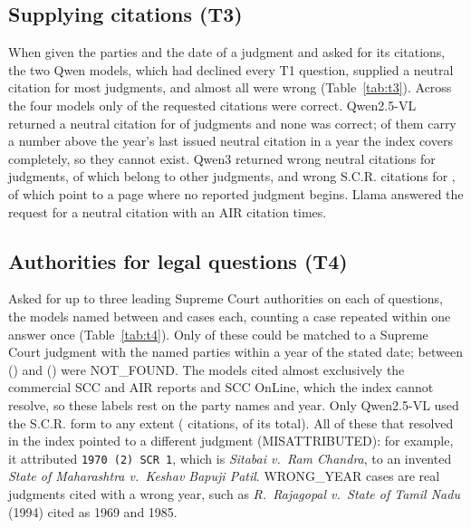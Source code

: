 \subsection{Supplying citations (T3)}
When given the parties and the date of a judgment and asked for its citations, the two Qwen models, which had declined every T1 question, supplied a neutral citation for most judgments, and almost all were wrong (Table~\ref{tab:t3}). Across the four models only \TThreeCorrectAll{} of the \TThreeAskedAll{} requested citations were correct. Qwen2.5-VL returned a neutral citation for \TThreeNeutralWrongQwenVL{} of \NumTThree{} judgments and none was correct; \TThreeUnassignedQwenVL{} of them carry a number above the year's last issued neutral citation in a year the index covers completely, so they cannot exist. Qwen3 returned wrong neutral citations for \TThreeNeutralWrongQwen{} judgments, \TThreeNeutralOtherJudgmentQwen{} of which belong to other judgments, and wrong S.C.R. citations for \TThreeScrWrongQwen{}, \TThreeScrNoJudgmentQwen{} of which point to a page where no reported judgment begins. Llama answered the request for a neutral citation with an AIR citation \TThreeNeutralOtherFormatLlama{} times.

\begin{table}[t]
\caption{Supplying the citations of \NumTThree{} known judgments, given parties and decision date. Corr.\ = exact match; Wrong = any other non-empty answer; Empty = no citation given.}
\label{tab:t3}
\centering
\setlength{\tabcolsep}{4pt}

\end{table}

\subsection{Authorities for legal questions (T4)}
Asked for up to three leading Supreme Court authorities on each of \NumTopics{} questions, the models named between \TFourCasesMin{} and \TFourCasesMax{} cases each, counting a case repeated within one answer once (Table~\ref{tab:t4}). Only \TFourVerifiedRange{} of these could be matched to a Supreme Court judgment with the named parties within a year of the stated date; between \TFourNFMinPct{} (\TFourNFMinModel) and \TFourNFMaxPct{} (\TFourNFMaxModel) were NOT\_FOUND. The models cited almost exclusively the commercial SCC and AIR reports and SCC OnLine, which the index cannot resolve, so these labels rest on the party names and year. Only Qwen2.5-VL used the S.C.R. form to any extent (\TFourReporterCitesQwenVL{} citations, \TFourReporterCitePctQwenVL{} of its total). All \TFourReporterResolvedMisQwenVL{} of these that resolved in the index pointed to a different judgment (MISATTRIBUTED): for example, it attributed \texttt{1970 (2) SCR 1}, which is \emph{Sitabai v.\ Ram Chandra}, to an invented \emph{State of Maharashtra v.\ Keshav Bapuji Patil}. WRONG\_YEAR cases are real judgments cited with a wrong year, such as \emph{R.\ Rajagopal v.\ State of Tamil Nadu} (1994) cited as 1969 and 1985.

